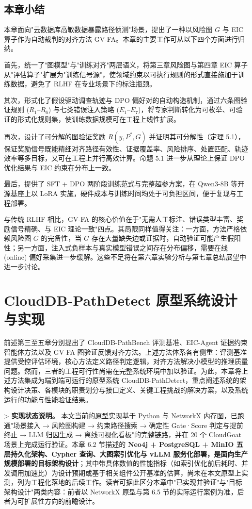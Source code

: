 \documentclass[a4paper,12pt]{ctexart}
\begin{document}
\subsection{本章小结}

本章面向"云数据库高敏数据暴露路径侦测"场景，提出了一种以风险图 $G$ 与 EIC 算子作为自动裁判的对齐方法 GV-FA。本章的主要工作可从以下四个方面进行归纳。

首先，统一了"图模型"与"训练对齐"两层语义，将第三章风险图与第四章 EIC 算子从"评估算子"扩展为"训练信号源"，使领域约束以可执行规则的形式直接施加于训练数据，避免了 RLHF 在专业场景下的标注瓶颈。

其次，形式化了假设驱动调查轨迹与 DPO 偏好对的自动构造机制，通过六条图验证规则 ($R_1$–$R_6$) 与七类错误注入策略 ($E_1$–$E_7$)，将专家判断转化为可枚举、可验证的形式化规则集，使训练数据规模可在工程上线性扩展。

再次，设计了可分解的图验证奖励 $R(y,P^*,G)$ 并证明其可分解性（定理 5.1），保证奖励信号既能精细对齐路径有效性、证据覆盖率、风险排序、处置匹配、轨迹效率等多目标，又可在工程上并行高效计算。命题 5.1 进一步从理论上保证 DPO 优化结果与 EIC 约束在分布上一致。

最后，提供了 SFT + DPO 两阶段训练范式与完整超参方案，在 Qwen3-8B 等开源基座上以 LoRA 实施，硬件成本与训练时间均处于可负担区间，便于复现与工程部署。

与传统 RLHF 相比，GV-FA 的核心价值在于"无需人工标注、错误类型丰富、奖励信号精确、与 EIC 理论一致"四点。其局限同样值得关注：一方面，方法严格依赖风险图 $G$ 的完备性，当 $G$ 存在大量缺失边或证据时，自动验证可能产生假阳性；另一方面，注入式负样本与真实模型错误之间存在分布偏移，需要在线 (online) 偏好采集进一步缓解。这些不足将在第六章实验分析与第七章总结展望中进一步讨论。



\section{CloudDB-PathDetect 原型系统设计与实现}

前述第三至五章分别提出了 CloudDB-PathBench 评测基准、EIC-Agent 证据约束智能体方法以及 GV-FA 图验证反馈对齐方法。上述方法体系各有侧重：评测基准提供受控评估环境，核心方法定义路径判定逻辑，对齐方法解决小模型的推理质量问题。然而，三者的工程可行性尚需在完整系统环境中加以验证。为此，本章将上述方法集成为端到端可运行的原型系统 CloudDB-PathDetect，重点阐述系统的架构设计决策、各模块的职责划分与接口定义、关键工程挑战的解决方案，以及系统运行的功能与性能验证结果。

\textgreater{} \textbf{实现状态说明。} 本文当前的原型实现基于 Python 与 NetworkX 内存图，已跑通"场景接入 → 风险图构建 → 约束路径搜索 → 确定性 Gate·Score 判定与提前终止 → LLM 归因生成 → 离线可视化看板"的完整链路，并在 20 个 CloudGoat 场景上完成运行验证。本章 6.2 节描述的 \textbf{Neo4j + PostgreSQL + MinIO 五层持久化架构、Cypher 查询、大图索引优化与 vLLM 服务化部署，是面向生产规模部署的目标架构设计}；其中带具体数值的性能指标（如索引优化前后耗时、并发调用加速比）为设计预期或基于相关组件公开基准的估算，尚未在本文原型上实测，列为工程化落地的后续工作。读者可据此区分本章中"已实现并验证"与"目标架构设计"两类内容：前者以 NetworkX 原型与第 6.5 节的实际运行案例为准，后者为可扩展性方向的前瞻设计。
\end{document}

